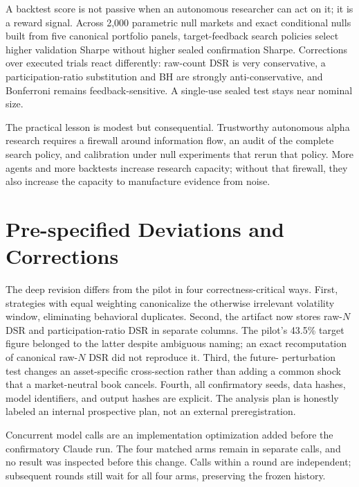 \documentclass[sigconf,nonacm]{acmart}
\begin{document}
A backtest score is not passive when an autonomous researcher can act on it; it
is a reward signal. Across 2,000 parametric null markets and exact conditional
nulls built from five canonical portfolio panels, target-feedback search
policies select higher validation Sharpe without higher sealed confirmation
Sharpe.
Corrections over executed trials react differently: raw-count DSR is very
conservative, a participation-ratio substitution and BH are strongly
anti-conservative, and Bonferroni remains feedback-sensitive. A single-use
sealed test stays near nominal size.

The practical lesson is modest but consequential. Trustworthy autonomous alpha
research requires a firewall around information flow, an audit of the complete
search policy, and calibration under null experiments that rerun that policy.
More agents and more backtests increase research capacity; without that
firewall, they also increase the capacity to manufacture evidence from noise.




\appendix

\section{Pre-specified Deviations and Corrections}

The deep revision differs from the pilot in four correctness-critical ways.
First, strategies with equal weighting canonicalize the otherwise irrelevant
volatility window, eliminating behavioral duplicates. Second, the artifact now
stores raw-$N$ DSR and participation-ratio DSR in separate columns. The pilot's
43.5\% target figure belonged to the latter despite ambiguous naming; an exact
recomputation of canonical raw-$N$ DSR did not reproduce it. Third, the future-
perturbation test changes an asset-specific cross-section rather than adding a
common shock that a market-neutral book cancels. Fourth, all confirmatory seeds,
data hashes, model identifiers, and output hashes are explicit. The analysis
plan is honestly labeled an internal prospective plan, not an external
preregistration.

Concurrent model calls are an implementation optimization added before the
confirmatory Claude run. The four matched arms remain in separate calls, and no
result was inspected before this change. Calls within a round are independent;
subsequent rounds still wait for all four arms, preserving the frozen history.
\end{document}
